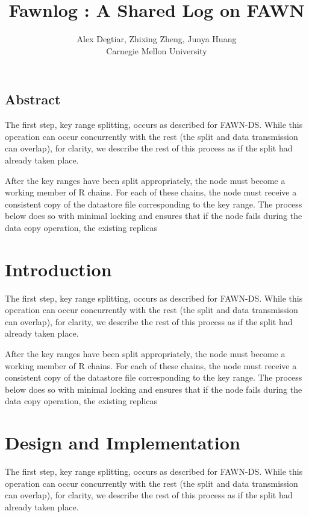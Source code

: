 \documentclass[letterpaper,twocolumn,10pt]{article}
\begin{document}
\date{}

\title{\LARGE \bf Fawnlog : A Shared Log on FAWN}

\author{
{\rm Alex Degtiar, Zhixing Zheng, Junya Huang}\\
Carnegie Mellon University}

\maketitle

\thispagestyle{empty}


\subsection*{Abstract}
The first step, key range splitting, occurs as described for\cite{corfu}
FAWN-DS\cite{fawn}. While this operation can occur concurrently with
the rest (the split and data transmission can overlap), for
clarity, we describe the rest of this process as if the split had
already taken place.

After the key ranges have been split appropriately, the node
must become a working member of R chains. For each of these chains, the node must receive a consistent copy of the datastore file corresponding to the key range. The process below does so with minimal locking and ensures that if the node fails during the data copy operation, the existing replicas
\section{Introduction}
The first step, key range splitting, occurs as described for
FAWN-DS. While this operation can occur concurrently with
the rest (the split and data transmission can overlap), for
clarity, we describe the rest of this process as if the split had
already taken place.

After the key ranges have been split appropriately, the node
must become a working member of R chains. For each of these chains, the node must receive a consistent copy of the datastore file corresponding to the key range. The process below does so with minimal locking and ensures that if the node fails during the data copy operation, the existing replicas
\section{Design and Implementation}
The first step, key range splitting, occurs as described for
FAWN-DS. While this operation can occur concurrently with
the rest (the split and data transmission can overlap), for
clarity, we describe the rest of this process as if the split had
already taken place.
\end{document}
